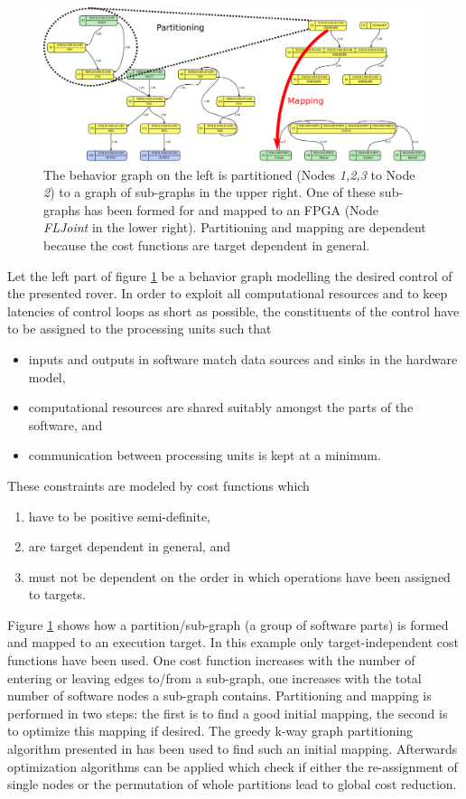 \documentclass[a4paper,twocolumn]{esapub2005} %
\begin{document}
\begin{figure}[t]
    \centering
    \includegraphics[width=.9\textwidth]{pics/PartAndMap.png}
    \caption{
        The behavior graph on the left is partitioned (Nodes \emph{1,2,3} to
        Node \emph{2}) to a graph of sub-graphs in the upper right.
        One of these sub-graphs has been formed for and mapped to an FPGA (Node \emph{FLJoint} in the lower right).
        Partitioning and mapping are dependent because the cost functions are target dependent in general.
    }
    \label{fig:PartAndMap}
\end{figure}
Let the left part of figure \ref{fig:PartAndMap} be a behavior graph modelling the desired control of the presented rover.
In order to exploit all computational resources and to keep latencies of control loops as short as possible,
the constituents of the control have to be assigned to the processing units such that
\begin{itemize}
    \item inputs and outputs in software match data sources and sinks in the hardware model,
    \item computational resources are shared suitably amongst the parts of the software, and
    \item communication between processing units is kept at a minimum.
\end{itemize}
These constraints are modeled by cost functions which
\begin{enumerate}
    \item have to be positive semi-definite,
    \item are target dependent in general, and
    \item must not be dependent on the order in which operations have been assigned to targets.
\end{enumerate}
Figure \ref{fig:PartAndMap} shows how a partition/sub-graph (a group of software parts) is formed and mapped to an execution target.
In this example only target-independent cost functions have been used.
One cost function increases with the number of entering or leaving edges to/from a sub-graph,
one increases with the total number of software nodes a sub-graph contains.
Partitioning and mapping is performed in two steps:
the first is to find a good initial mapping, the second is to optimize this mapping if desired.
The greedy k-way graph partitioning algorithm presented in \cite{2000_Jain} has been used to find such an initial mapping.
Afterwards optimization algorithms can be applied which check if either the re-assignment of single nodes or the permutation of whole partitions lead to global cost reduction.
\end{document}
